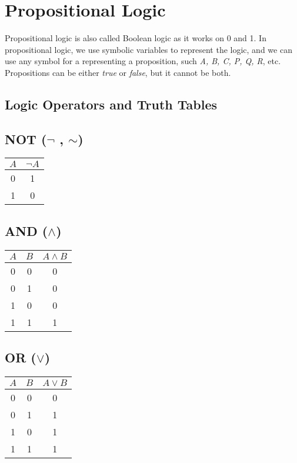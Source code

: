 \section{Propositional Logic}
Propositional logic is also called Boolean logic as it works on 0 and 1. In propositional logic, we use symbolic variables to represent the logic, and we can use any symbol for a representing a proposition, such \textit{A, B, C, P, Q, R}, etc. Propositions can be either \textit{true} or \textit{false}, but it cannot be both.

\subsection{Logic Operators and Truth Tables}
\smallskip
\begin{multicols}{2}

\subsection*{NOT ($\neg$ , $\sim$)}

\begin{tabular}{cc}
\toprule
$A$ & $\neg A$ \\
\midrule
0 & 1 \\
1 & 0 \\
\bottomrule
\end{tabular}

\vspace{1em}

\subsection*{AND ($\land$)}

\begin{tabular}{ccc}
\toprule
$A$ & $B$ & $A \land B$ \\
\midrule
0 & 0 & 0 \\
0 & 1 & 0 \\
1 & 0 & 0 \\
1 & 1 & 1 \\
\bottomrule
\end{tabular}

\vspace{1em}

\subsection*{OR ($\lor$)}

\begin{tabular}{ccc}
\toprule
$A$ & $B$ & $A \lor B$ \\
\midrule
0 & 0 & 0 \\
0 & 1 & 1 \\
1 & 0 & 1 \\
1 & 1 & 1 \\
\bottomrule
\end{tabular}


\end{multicols}
